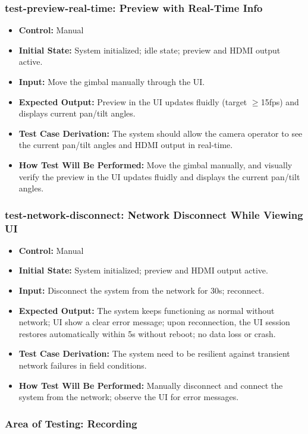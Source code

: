 \documentclass[12pt, titlepage]{article}
\begin{document}
\subsubsection*{test-preview-real-time: Preview with Real-Time Info}
\begin{itemize}
  \item \textbf{Control:} Manual
  \item \textbf{Initial State:} System initialized; idle state; preview and HDMI output active.
  \item \textbf{Input:} Move the gimbal manually through the UI.
  \item \textbf{Expected Output:} Preview in the UI updates fluidly (target $\geq$15fps) and displays current pan/tilt angles.
  \item \textbf{Test Case Derivation:} The system should allow the camera operator to see the current pan/tilt angles and HDMI output in real-time.
  \item \textbf{How Test Will Be Performed:} Move the gimbal manually, and visually verify the preview in the UI updates fluidly and displays the current pan/tilt angles.
\end{itemize}

\subsubsection*{test-network-disconnect: Network Disconnect While Viewing UI}
\begin{itemize}
  \item \textbf{Control:} Manual
  \item \textbf{Initial State:} System initialized; preview and HDMI output active.
  \item \textbf{Input:} Disconnect the system from the network for 30s; reconnect.
  \item \textbf{Expected Output:} The system keeps functioning as normal without network; UI show a clear error message; upon reconnection, the UI session restores automatically within 5s without reboot; no data loss or crash.
  \item \textbf{Test Case Derivation:} The system need to be resilient against transient network failures in field conditions.
  \item \textbf{How Test Will Be Performed:} Manually disconnect and connect the system from the network; observe the UI for error messages.
\end{itemize}

\subsubsection{Area of Testing: Recording}
\end{document}
